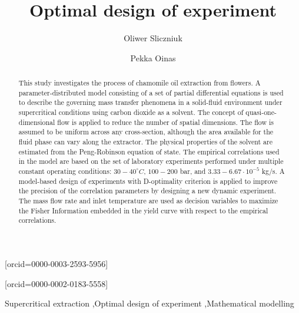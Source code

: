 \documentclass[a4paper,fleqn]{cas-dc}
\begin{document}
 

\title[mode=title]{Optimal design of experiment}                      


\author[1]{Oliwer Sliczniuk}[orcid=0000-0003-2593-5956]
\cormark[1]

\author[1]{Pekka Oinas}[orcid=0000-0002-0183-5558]


\address[1]{Aalto University, School of Chemical Engineering, Espoo, 02150, Finland}


\begin{abstract}
This study investigates the process of chamomile oil extraction from flowers. A parameter-distributed model consisting of a set of partial differential equations is used to describe the governing mass transfer phenomena in a solid-fluid environment under supercritical conditions using carbon dioxide as a solvent. The concept of quasi-one-dimensional flow is applied to reduce the number of spatial dimensions. The flow is assumed to be uniform across any cross-section, although the area available for the fluid phase can vary along the extractor. The physical properties of the solvent are estimated from the Peng-Robinson equation of state. The empirical correlations used in the model are based on the set of laboratory experiments performed under multiple constant operating conditions: $30 - 40^\circ C$, $100 - 200$ bar, and $3.33-6.67 \cdot 10^{-5}$ kg/s. A model-based design of experiments with D-optimality criterion is applied to improve the precision of the correlation parameters by designing a new dynamic experiment. The mass flow rate and inlet temperature are used as decision variables to maximize the Fisher Information embedded in the yield curve with respect to the empirical correlations. 

\end{abstract}

\begin{keywords}
Supercritical extraction \sep Optimal design of experiment \sep Mathematical modelling
\end{keywords}
\end{document}
